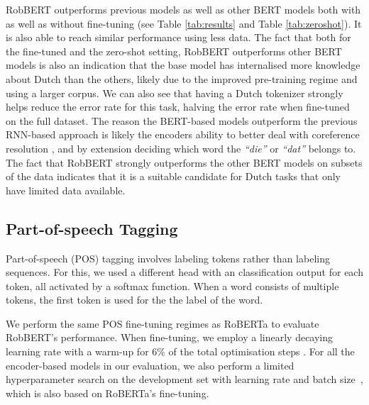 \documentclass[11pt,a4paper]{article}
\begin{document}
RobBERT outperforms previous models as well as other BERT models both with as well as without fine-tuning (see Table \ref{tab:results} and Table \ref{tab:zeroshot}).
It is also able to reach similar performance using less data.
The fact that both for the fine-tuned and the zero-shot setting, RobBERT outperforms other BERT models is also an indication that the base model has internalised more knowledge about Dutch than the others, likely due to the improved pre-training regime and using a larger corpus.
We can also see that having a Dutch tokenizer strongly helps reduce the error rate for this task, halving the error rate when fine-tuned on the full dataset.
The reason the BERT-based models outperform the previous RNN-based approach is likely the encoders ability to better deal with coreference resolution \citep{joshi2019spanbert}, and by extension deciding which word the \textit{``die''} or \textit{``dat''} belongs to.
The fact that RobBERT strongly outperforms the other BERT models on subsets of the data indicates that it is a suitable candidate for Dutch tasks that only have limited data available.







\subsection{Part-of-speech Tagging}
\label{ss:pos}

Part-of-speech (POS) tagging involves labeling tokens rather than labeling sequences.
For this, we used a different head with an classification output for each token, all activated by a softmax function. 
When a word consists of multiple tokens, the first token is used for the the label of the word. 




We perform the same POS fine-tuning regimes as RoBERTa \citep{liuRoBERTa2019} to evaluate RobBERT's performance.
When fine-tuning, we employ a linearly decaying learning rate with a warm-up for 6\% of the total optimisation steps \citep{liuRoBERTa2019}.
For all the encoder-based models in our evaluation, we also perform a limited hyperparameter search on the development set with learning rate  and batch size~, which is also based on RoBERTa's fine-tuning.
\end{document}
